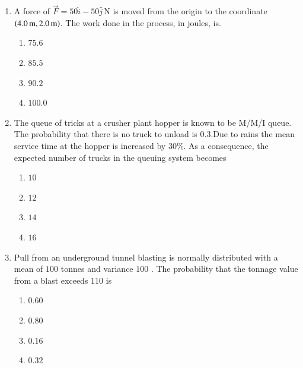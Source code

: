 \documentclass[journal,12pt,onecolumn]{IEEEtran}
\theoremstyle{remark}
\begin{document}
\begin{enumerate}
\item A force of $\vec{F} = 50\hat{i} - 50\hat{j} \, \text{N}$ is moved from the origin to the coordinate $\left(4.0\,\text{m}, 2.0\,\text{m}\right)$. The work done in the process, in joules, is.


\hfill{}

\begin{multicols}{4}
\begin{enumerate}
\item $75.6$
\item $85.5$
\item $90.2$
\item $100.0$
\end{enumerate}
\end{multicols}

\item The queue of tricks at a crusher plant hopper is known to be M/M/I queue. The probability that
there is no truck to unload is $0.3$.Due to rains the mean service time at the hopper is increased by $30$\%. As a consequence, the expected number of trucks in the queuing system 
 becomes

\hfill{}

\begin{multicols}{4}
\begin{enumerate}
\item $10$
\item $12$
\item $14$
\item $16$
\end{enumerate}
\end{multicols}

\item Pull from an underground tunnel blasting is normally distributed with a mean of $100$ tonnes and
variance $100$ . The probability that the tonnage value from a blast exceeds $110$ is


\hfill{}

\begin{multicols}{4}
\begin{enumerate}
\item $0.60 $
\item $0.80$
\item $0.16$
\item $0.32$
\end{enumerate}
\end{multicols}


\end{enumerate}
\end{document}
